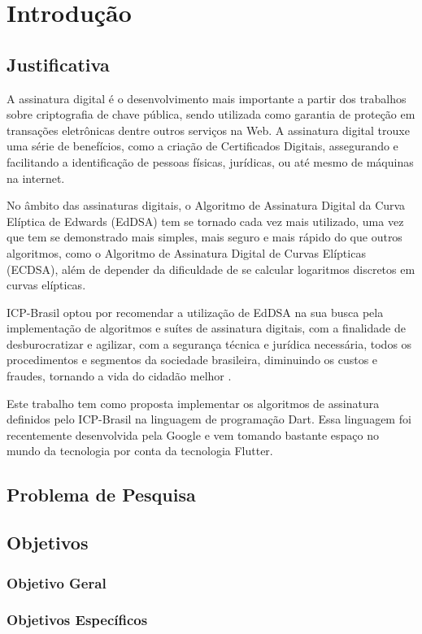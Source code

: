 \chapter[Introdução]{Introdução}

\section{Justificativa}

A assinatura digital é o desenvolvimento mais importante a partir dos trabalhos sobre criptografia de chave pública, sendo utilizada como garantia de proteção em transações eletrônicas dentre outros serviços na Web. A assinatura digital trouxe uma série de benefícios, como a criação de Certificados Digitais, assegurando e facilitando a identificação de pessoas físicas, jurídicas, ou até mesmo de máquinas na internet. 

No âmbito das assinaturas digitais, o Algoritmo de Assinatura Digital da Curva Elíptica de Edwards (EdDSA) tem se tornado cada vez mais utilizado, uma vez que tem se demonstrado mais simples, mais seguro e mais rápido do que outros algoritmos, como o Algoritmo de Assinatura Digital de Curvas Elípticas (ECDSA), além de depender da dificuldade de se calcular logaritmos discretos em curvas elípticas. 

ICP-Brasil optou por recomendar a utilização de EdDSA na sua busca pela implementação de algoritmos e suítes de assinatura digitais, com a finalidade de desburocratizar e agilizar, com a segurança técnica e jurídica necessária, todos os procedimentos e segmentos da sociedade brasileira, diminuindo os custos e fraudes, tornando a vida do cidadão melhor \cite{iti2018}.

Este trabalho tem como proposta implementar os algoritmos de assinatura definidos pelo ICP-Brasil na linguagem de programação Dart. Essa linguagem foi recentemente desenvolvida pela Google e vem tomando bastante espaço no mundo da tecnologia por conta da tecnologia Flutter. 

\section{Problema de Pesquisa}

\section{Objetivos}

\subsection{Objetivo Geral}

\subsection{Objetivos Específicos}

